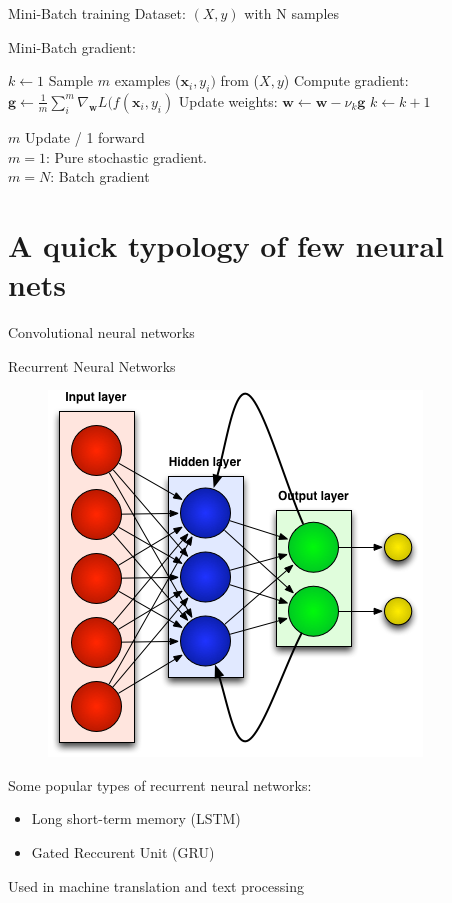 \documentclass[handout]{beamer}
\begin{document}
\begin{frame}{Mini-Batch training}
Dataset: $(X,y)$ with N samples
\begin{footnotesize}
\begin{block}{Mini-Batch gradient:}\end{block}

    \begin{algorithmic}
    \State $k \leftarrow 1$
    \State Sample $m$ examples ($\mathbf{x}_i,y_i)$ from ($X,y$)
    \State Compute gradient: $\mathbf{g} \leftarrow \frac{1}{m}\sum_i^m\nabla_\mathbf{w}L(f(\mathbf{x}_i,y_i)$
    \State Update weights: $\mathbf{w} \leftarrow \mathbf{w} - \nu_k\mathbf{g}$
    \State $k \leftarrow k + 1$
    \EndWhile 
    
    \end{algorithmic}
    \end{footnotesize}
    \pause
        \alert{$m$ Update / 1 forward}\\
        $m=1$: Pure stochastic gradient.\\
        $m=N$: Batch gradient

\end{frame}

\section{A quick typology of few neural nets}

\begin{frame}{Convolutional neural networks}
    
\end{frame}
\begin{frame}{Recurrent Neural Networks}
    \begin{figure}
        \centering
        \includegraphics[width=.4\textwidth]{fig/L2/rnn.png}

    \end{figure}

Some popular types of recurrent neural networks:
\begin{itemize}
    \item Long short-term memory (LSTM)
    \item Gated Reccurent Unit (GRU)
\end{itemize}
\alert{Used in machine translation and text processing}
\end{frame}
\end{document}
